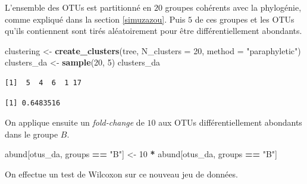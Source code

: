 \documentclass[12pt,a4paper]{reedthesis}
\newenvironment{Shaded}{\begin{snugshade}}{\end{snugshade}}
\newcommand{\DataTypeTok}[1]{\textcolor[rgb]{0.13,0.29,0.53}{#1}}
\newcommand{\DecValTok}[1]{\textcolor[rgb]{0.00,0.00,0.81}{#1}}
\newcommand{\KeywordTok}[1]{\textcolor[rgb]{0.13,0.29,0.53}{\textbf{#1}}}
\newcommand{\NormalTok}[1]{#1}
\newcommand{\OperatorTok}[1]{\textcolor[rgb]{0.81,0.36,0.00}{\textbf{#1}}}
\newcommand{\StringTok}[1]{\textcolor[rgb]{0.31,0.60,0.02}{#1}}
\theoremstyle{definition}
\theoremstyle{definition}
\theoremstyle{definition}
\theoremstyle{remark}
\begin{document}
L'ensemble des OTUs est partitionné en \(20\) groupes cohérents avec la phylogénie, comme expliqué dans la section \ref{simuzazou}. Puis \(5\) de ces groupes et les OTUs qu'ils contiennent sont tirés aléatoirement pour être différentiellement abondants.
\begin{Shaded}
\begin{Highlighting}[]
\NormalTok{clustering <-}\StringTok{ }\KeywordTok{create_clusters}\NormalTok{(tree, }\DataTypeTok{N_clusters =} \DecValTok{20}\NormalTok{, }
                              \DataTypeTok{method =} \StringTok{"paraphyletic"}\NormalTok{)}
\NormalTok{clusters_da <-}\StringTok{ }\KeywordTok{sample}\NormalTok{(}\DecValTok{20}\NormalTok{, }\DecValTok{5}\NormalTok{)}
\NormalTok{clusters_da}
\end{Highlighting}
\end{Shaded}
\begin{verbatim}
[1]  5  4  6  1 17
\end{verbatim}
\begin{Shaded}
\end{Shaded}
\begin{verbatim}
[1] 0.6483516
\end{verbatim}
On applique ensuite un \emph{fold-change} de \(10\) aux OTUs différentiellement abondants dans le groupe \(B\).
\begin{Shaded}
\begin{Highlighting}[]
\NormalTok{abund[otus_da, groups }\OperatorTok{==}\StringTok{ "B"}\NormalTok{] <-}\StringTok{ }\DecValTok{10} \OperatorTok{*}\StringTok{ }\NormalTok{abund[otus_da,  groups }\OperatorTok{==}\StringTok{ "B"}\NormalTok{]}
\end{Highlighting}
\end{Shaded}
On effectue un test de Wilcoxon sur ce nouveau jeu de données.
\end{document}
